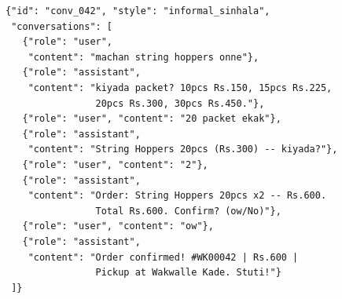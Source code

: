 \documentclass[12pt,a4paper]{report}
\begin{document}
\begin{lstlisting}[caption=Sample synthetic training conversation (conv\_042)]
{"id": "conv_042", "style": "informal_sinhala",
 "conversations": [
   {"role": "user",
    "content": "machan string hoppers onne"},
   {"role": "assistant",
    "content": "kiyada packet? 10pcs Rs.150, 15pcs Rs.225,
                20pcs Rs.300, 30pcs Rs.450."},
   {"role": "user", "content": "20 packet ekak"},
   {"role": "assistant",
    "content": "String Hoppers 20pcs (Rs.300) -- kiyada?"},
   {"role": "user", "content": "2"},
   {"role": "assistant",
    "content": "Order: String Hoppers 20pcs x2 -- Rs.600.
                Total Rs.600. Confirm? (ow/No)"},
   {"role": "user", "content": "ow"},
   {"role": "assistant",
    "content": "Order confirmed! #WK00042 | Rs.600 |
                Pickup at Wakwalle Kade. Stuti!"}
 ]}
\end{lstlisting}
\end{document}
